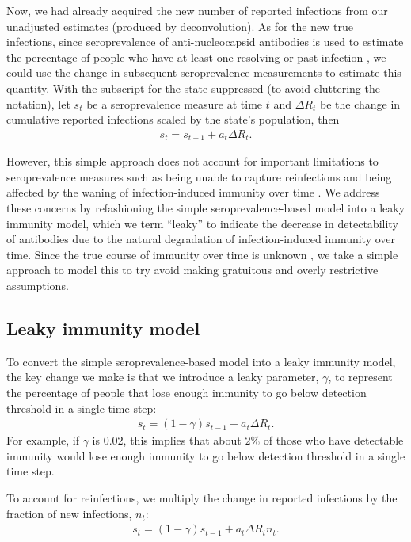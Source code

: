 \documentclass{article}
\begin{document}
Now, we had already acquired the new number of reported infections from our unadjusted estimates (produced by deconvolution). As for the new true infections, since seroprevalence of anti-nucleocapsid antibodies is used to estimate the percentage of people who have at least one resolving or past infection \citep{cdc2020data}, we could use the change in subsequent seroprevalence measurements to estimate this quantity. With the subscript for the state suppressed (to avoid cluttering the notation), let $s_t$ be a seroprevalence measure at time $t$ and $\Delta R_t$ be the change in cumulative reported infections scaled by the state’s population, then 
\begin{align*}
    s_t = s_{t-1}+ a_t\Delta R_t.
\end{align*}

However, this simple approach does not account for important limitations to seroprevalence measures such as being unable to capture reinfections \citep{cdc2020data} and being affected by the waning of infection-induced immunity over time \citep{seow2020longitudinal, ibarrondo2020rapid}. We address these concerns by refashioning the simple seroprevalence-based model into a leaky immunity model, which we term ``leaky'' to indicate the decrease in detectability of antibodies due to the natural degradation of infection-induced immunity over time. Since the true course of immunity over time is unknown \citep{goldberg2022protection}, we take a simple approach to model this to try avoid making gratuitous and overly restrictive assumptions.

\subsection{Leaky immunity model} To convert the simple seroprevalence-based model into a leaky immunity model, the key change we make is that we introduce a leaky parameter, $\gamma$, to represent the percentage of people that lose enough immunity to go below detection threshold in a single time step:
\begin{align*}
s_t = (1 -\gamma)s_{t-1} + a_t\Delta R_t. %
\end{align*}
For example, if $\gamma$ is $0.02$, this implies that about $2\%$ of those who have detectable immunity would lose enough immunity to go below detection threshold in a single time step.

To account for reinfections, we multiply the change in reported infections by the fraction of new infections, $n_t$:
\begin{align*}
s_t = (1 -\gamma)s_{t-1} + a_t\Delta R_t n_t.
\end{align*}
\end{document}
